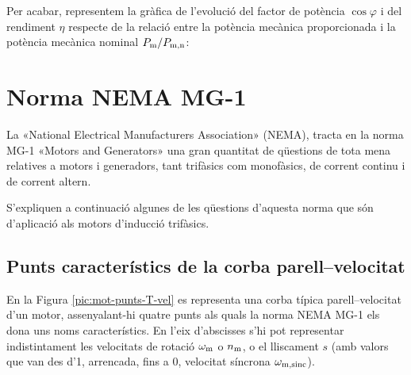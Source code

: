 \begin{exemple}
	Per acabar, representem  la gràfica de l'evolució del factor de potència $\cos\varphi$ i del rendiment $\eta$  respecte de la relació entre la potència mecànica proporcionada i la potència mecànica nominal $P_\mathrm{m}/P_\mathrm{m,n}$:
	\begin{center}
		
	\end{center}

\end{exemple}
	
	
\section{Norma NEMA MG-1}

La «National Electrical Manufacturers Association» (NEMA),
tracta en la norma  MG-1 «Motors and Generators» una gran quantitat de qüestions de tota mena relatives a motors i generadors, tant trifàsics com monofàsics, de corrent continu i de corrent altern.

S'expliquen a continuació algunes de les qüestions d'aquesta norma que són d'aplicació als motors d'inducció trifàsics.

\subsection{Punts característics de la corba parell--velocitat}

En la Figura \vref{pic:mot-punts-T-vel} es representa una corba típica parell--velocitat d'un motor, assenyalant-hi quatre punts als quals la norma NEMA MG-1 els dona uns noms característics. En l'eix d'abscisses s'hi pot representar indistintament les velocitats de rotació $\omega_\mathrm{m}$ o $n_\mathrm{m}$, o  el lliscament $s$ (amb valors que van des d'1, arrencada, fins a 0, velocitat síncrona $\omega_\mathrm{m,sinc}$).

\begin{center}
	
	\label{pic:mot-punts-T-vel}
\end{center}

